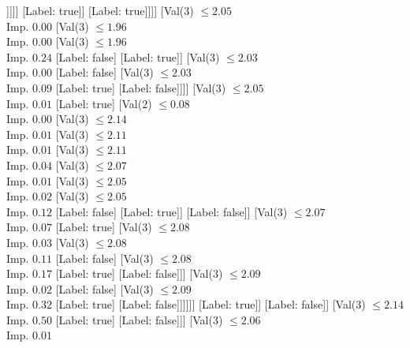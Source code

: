 \documentclass[margin=10pt]{standalone}
\begin{document}
\begin{forest}
																]]]]
												[Label: true]]
											[Label: true]]]]
								[Val($3$) $ \leq 2.05$ \\ Imp. $0.00$
									[Val($3$) $ \leq 1.96$ \\ Imp. $0.00$
										[Val($3$) $ \leq 1.96$ \\ Imp. $0.24$
											[Label: false]
											[Label: true]]
										[Val($3$) $ \leq 2.03$ \\ Imp. $0.00$
											[Label: false]
											[Val($3$) $ \leq 2.03$ \\ Imp. $0.09$
												[Label: true]
												[Label: false]]]]
									[Val($3$) $ \leq 2.05$ \\ Imp. $0.01$
										[Label: true]
										[Val($2$) $ \leq 0.08$ \\ Imp. $0.00$
											[Val($3$) $ \leq 2.14$ \\ Imp. $0.01$
												[Val($3$) $ \leq 2.11$ \\ Imp. $0.01$
													[Val($3$) $ \leq 2.11$ \\ Imp. $0.04$
														[Val($3$) $ \leq 2.07$ \\ Imp. $0.01$
															[Val($3$) $ \leq 2.05$ \\ Imp. $0.02$
																[Val($3$) $ \leq 2.05$ \\ Imp. $0.12$
																	[Label: false]
																	[Label: true]]
																[Label: false]]
															[Val($3$) $ \leq 2.07$ \\ Imp. $0.07$
																[Label: true]
																[Val($3$) $ \leq 2.08$ \\ Imp. $0.03$
																	[Val($3$) $ \leq 2.08$ \\ Imp. $0.11$
																		[Label: false]
																		[Val($3$) $ \leq 2.08$ \\ Imp. $0.17$
																			[Label: true]
																			[Label: false]]]
																	[Val($3$) $ \leq 2.09$ \\ Imp. $0.02$
																		[Label: false]
																		[Val($3$) $ \leq 2.09$ \\ Imp. $0.32$
																			[Label: true]
																			[Label: false]]]]]]
														[Label: true]]
													[Label: false]]
												[Val($3$) $ \leq 2.14$ \\ Imp. $0.50$
													[Label: true]
													[Label: false]]]
											[Val($3$) $ \leq 2.06$ \\ Imp. $0.01$

\end{forest}
\end{document}
